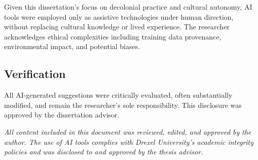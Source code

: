 Given this dissertation's focus on decolonial practice and cultural autonomy, AI tools were employed only as assistive technologies under human direction, without replacing cultural knowledge or lived experience. The researcher acknowledges ethical complexities including training data provenance, environmental impact, and potential biases.

\subsection*{Verification}

All AI-generated suggestions were critically evaluated, often substantially modified, and remain the researcher's sole responsibility. This disclosure was approved by the dissertation advisor.

\vspace{1.5em}

\emph{All content included in this document was reviewed, edited, and approved by the author. The use of AI tools complies with Drexel University’s academic integrity policies and was disclosed to and approved by the thesis advisor.}